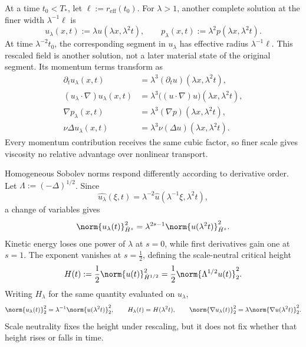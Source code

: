 
At a time \(t_0<T_*\), let \(\ell:=r_{\mathrm{eff}}(t_0)\). For \(\lambda>1\), another complete \NavierStokes{} solution at the finer width \(\lambda^{-1}\ell\) is
\[
  u_\lambda(x,t)
  :=
  \lambda u(\lambda x,\lambda^2t),
  \qquad
  p_\lambda(x,t)
  :=
  \lambda^2p(\lambda x,\lambda^2t).
\]
At time \(\lambda^{-2}t_0\), the corresponding segment in \(u_\lambda\) has effective radius \(\lambda^{-1}\ell\). This rescaled field is another solution, not a later material state of the original segment. Its momentum terms transform as
\[
\begin{aligned}
  \partial_tu_\lambda(x,t)
  &=
  \lambda^3(\partial_tu)(\lambda x,\lambda^2t),
  \\
  (u_\lambda\cdot\nabla)u_\lambda(x,t)
  &=
  \lambda^3\bigl((u\cdot\nabla)u\bigr)(\lambda x,\lambda^2t),
  \\
  \nabla p_\lambda(x,t)
  &=
  \lambda^3(\nabla p)(\lambda x,\lambda^2t),
  \\
  \nu\Delta u_\lambda(x,t)
  &=
  \lambda^3\nu(\Delta u)(\lambda x,\lambda^2t).
\end{aligned}
\]
Every momentum contribution receives the same cubic factor, so finer scale gives viscosity no relative advantage over nonlinear transport.


Homogeneous Sobolev norms respond differently according to derivative order. Let \(\Lambda:=(-\Delta)^{1/2}\). Since
\[
  \widehat{u_\lambda}(\xi,t)
  =
  \lambda^{-2}\widehat u(\lambda^{-1}\xi,\lambda^2t),
\]
a change of variables gives
\[
  \norm{u_\lambda(t)}_{\dot H^s}^2
  =
  \lambda^{2s-1}
  \norm{u(\lambda^2t)}_{\dot H^s}^2.
\]
Kinetic energy loses one power of \(\lambda\) at \(s=0\), while first derivatives gain one at \(s=1\). The exponent vanishes at \(s=\tfrac12\), defining the scale-neutral critical height
\[
  H(t)
  :=
  \frac12\norm{u(t)}_{\dot H^{1/2}}^2
  =
  \frac12\norm{\Lambda^{1/2}u(t)}_2^2.
\]
Writing \(H_\lambda\) for the same quantity evaluated on \(u_\lambda\),
\[
  \norm{u_\lambda(t)}_2^2
  =
  \lambda^{-1}\norm{u(\lambda^2t)}_2^2,
  \qquad
  H_\lambda(t)=H(\lambda^2t),
  \qquad
  \norm{\nabla u_\lambda(t)}_2^2
  =
  \lambda\norm{\nabla u(\lambda^2t)}_2^2.
\]
Scale neutrality fixes the height under rescaling, but it does not fix whether that height rises or falls in time.


